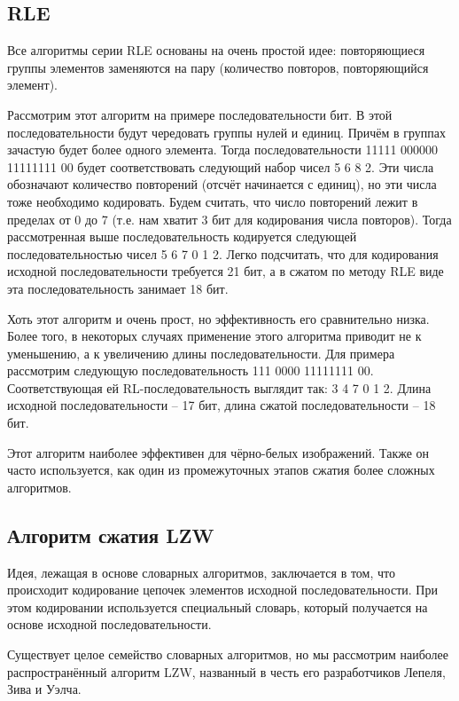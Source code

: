\subsection*{RLE}
Все алгоритмы серии RLE основаны на очень простой идее: повторяющиеся группы элементов заменяются на пару (количество повторов, повторяющийся элемент). 

Рассмотрим этот алгоритм на примере последовательности бит. В этой последовательности будут чередовать группы нулей и единиц. Причём в группах зачастую будет более одного элемента. Тогда последовательности 11111 000000 11111111 00 будет соответствовать следующий набор чисел 5 6 8 2. Эти числа обозначают количество повторений (отсчёт начинается с единиц), но эти числа тоже необходимо кодировать. Будем считать, что число повторений лежит в пределах от 0 до 7 (т.е. нам хватит 3 бит для кодирования числа повторов). Тогда рассмотренная выше последовательность кодируется следующей последовательностью чисел 5 6 7 0 1 2. Легко подсчитать, что для кодирования исходной последовательности требуется 21 бит, а в сжатом по методу RLE виде эта последовательность занимает 18 бит.

Хоть этот алгоритм и очень прост, но эффективность его сравнительно низка. Более того, в некоторых случаях применение этого алгоритма приводит не к уменьшению, а к увеличению длины последовательности. Для примера рассмотрим следующую последовательность 111 0000 11111111 00. Соответствующая ей RL-последовательность выглядит так: 3 4 7 0 1 2. Длина исходной последовательности – 17 бит, длина сжатой последовательности – 18 бит.

Этот алгоритм наиболее эффективен для чёрно-белых изображений. Также он часто используется, как один из промежуточных этапов сжатия более сложных алгоритмов.

\subsection*{Алгоритм сжатия LZW}

Идея, лежащая в основе словарных алгоритмов, заключается в том, что происходит кодирование цепочек элементов исходной последовательности. При этом кодировании используется специальный словарь, который получается на основе исходной последовательности. 

Существует целое семейство словарных алгоритмов, но мы рассмотрим наиболее распространённый алгоритм LZW, названный в честь его разработчиков Лепеля, Зива и Уэлча. 

